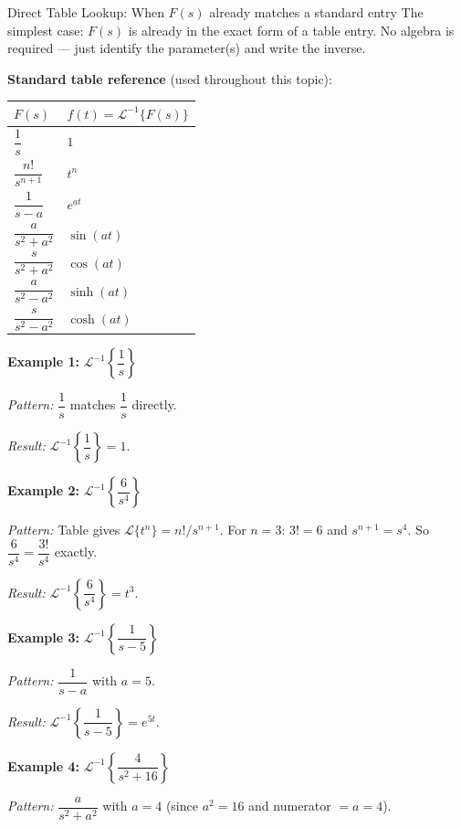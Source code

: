 \documentclass[12pt,a4paper]{article}
\begin{document}
\begin{infobox}{Direct Table Lookup: When $F(s)$ already matches a standard entry}
The simplest case: $F(s)$ is already in the exact form of a table entry.
No algebra is required --- just identify the parameter(s) and write the inverse.

\medskip
\textbf{Standard table reference} (used throughout this topic):

\smallskip
\begin{center}
\begin{tabular}{@{}ll@{}}
\toprule
$F(s)$ & $f(t) = \mathcal{L}^{-1}\{F(s)\}$ \\
\midrule
$\dfrac{1}{s}$ & $1$ \\[6pt]
$\dfrac{n!}{s^{n+1}}$ & $t^n$ \\[6pt]
$\dfrac{1}{s-a}$ & $e^{at}$ \\[6pt]
$\dfrac{a}{s^2+a^2}$ & $\sin(at)$ \\[6pt]
$\dfrac{s}{s^2+a^2}$ & $\cos(at)$ \\[6pt]
$\dfrac{a}{s^2-a^2}$ & $\sinh(at)$ \\[6pt]
$\dfrac{s}{s^2-a^2}$ & $\cosh(at)$ \\
\bottomrule
\end{tabular}
\end{center}

\medskip
\textbf{Example 1:} $\mathcal{L}^{-1}\left\{\dfrac{1}{s}\right\}$

\textit{Pattern:} $\dfrac{1}{s}$ matches $\dfrac{1}{s}$ directly.

\textit{Result:} $\mathcal{L}^{-1}\left\{\dfrac{1}{s}\right\} = 1$.

\medskip
\textbf{Example 2:} $\mathcal{L}^{-1}\left\{\dfrac{6}{s^4}\right\}$

\textit{Pattern:} Table gives $\mathcal{L}\{t^n\} = n!/s^{n+1}$.
For $n=3$: $3! = 6$ and $s^{n+1} = s^4$. So $\dfrac{6}{s^4} = \dfrac{3!}{s^4}$ exactly.

\textit{Result:} $\mathcal{L}^{-1}\left\{\dfrac{6}{s^4}\right\} = t^3$.

\medskip
\textbf{Example 3:} $\mathcal{L}^{-1}\left\{\dfrac{1}{s-5}\right\}$

\textit{Pattern:} $\dfrac{1}{s-a}$ with $a = 5$.

\textit{Result:} $\mathcal{L}^{-1}\left\{\dfrac{1}{s-5}\right\} = e^{5t}$.

\medskip
\textbf{Example 4:} $\mathcal{L}^{-1}\left\{\dfrac{4}{s^2+16}\right\}$

\textit{Pattern:} $\dfrac{a}{s^2+a^2}$ with $a = 4$ (since $a^2 = 16$ and numerator $= a = 4$).


\end{infobox}
\end{document}
